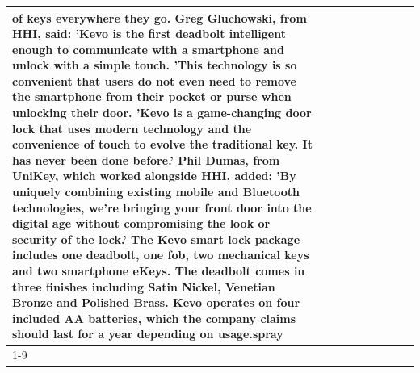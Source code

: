 \begin{table}[H]
\begin{tabular}{lllrlllll}
of keys everywhere they go. Greg Gluchowski, from HHI, said: 'Kevo is the first deadbolt intelligent enough to communicate with a smartphone and unlock with a simple touch. 'This technology is so convenient that users do not even need to remove the smartphone from their pocket or purse when unlocking their door. 'Kevo is a game-changing door lock that uses modern technology and the convenience of touch to evolve the traditional key. It has never been done before.' Phil Dumas, from UniKey, which worked alongside HHI, added: 'By uniquely combining existing mobile and Bluetooth technologies, we’re bringing your front door into the digital age without compromising the look or security of the lock.' The Kevo smart lock package includes one deadbolt, one fob, two mechanical keys and two smartphone eKeys. The deadbolt comes in three finishes including Satin Nickel, Venetian Bronze and Polished Brass. Kevo operates on four included AA batteries, which the company claims should last for a year depending on usage.spray \\
\cline{1-9}

\end{tabular}
\end{table}
